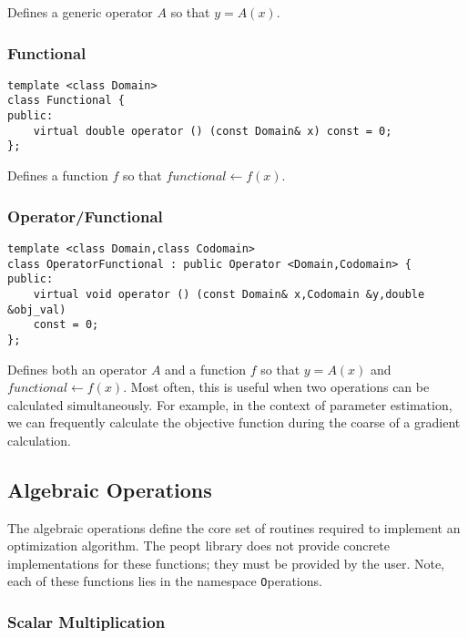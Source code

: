 \documentclass{article}
\begin{document}
Defines a generic operator $A$ so that $y=A(x)$.

\subsubsection{Functional}

\begin{flushleft}
\begin{lstlisting}
template <class Domain>
class Functional {
public:
    virtual double operator () (const Domain& x) const = 0;
};
\end{lstlisting}
\end{flushleft}

Defines a function $f$ so that $functional\leftarrow f(x)$.

\subsubsection{Operator/Functional}

\begin{flushleft}
\begin{lstlisting}
template <class Domain,class Codomain>
class OperatorFunctional : public Operator <Domain,Codomain> {
public:
    virtual void operator () (const Domain& x,Codomain &y,double &obj_val)
	const = 0;
};
\end{lstlisting}
\end{flushleft}

Defines both an operator $A$ and a function $f$ so that $y=A(x)$ and $functional\leftarrow f(x)$.  Most often, this is useful when two operations can be calculated simultaneously.  For example, in the context of parameter estimation, we can frequently calculate the objective function during the coarse of a gradient calculation.

\subsection{Algebraic Operations}

	The algebraic operations define the core set of routines required to implement an optimization algorithm.  The peopt library does not provide concrete implementations for these functions; they must be provided by the user.  Note, each of these functions lies in the namespace {\texttt Operations}.

\subsubsection{Scalar Multiplication}
\end{document}
